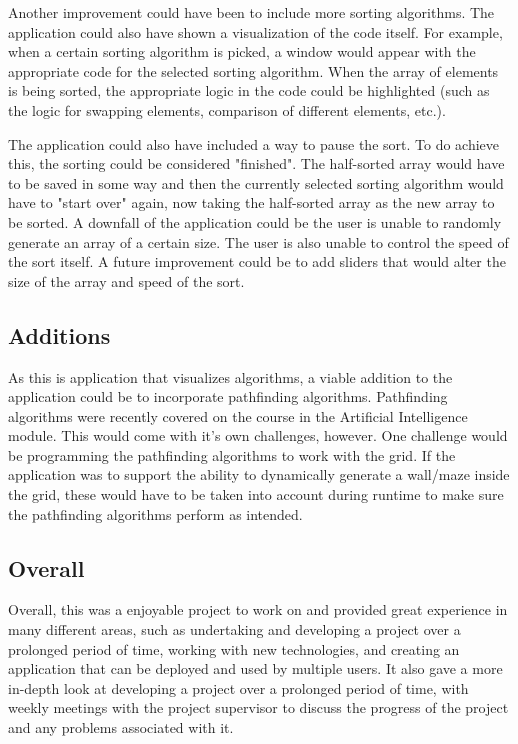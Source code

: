 Another improvement could have been to include more sorting algorithms. The application could also have shown a visualization of the code itself. For example, when a certain sorting algorithm is picked, a window would appear with the appropriate code for the selected sorting algorithm. When the array of elements is being sorted, the appropriate logic in the code could be highlighted (such as the logic for swapping elements, comparison of different elements, etc.).
\bigskip

The application could also have included a way to pause the sort. To do achieve this, the sorting could be considered "finished". The half-sorted array would have to be saved in some way and then the currently selected sorting algorithm would have to "start over" again, now taking the half-sorted array as the new array to be sorted. 
\bigskip
A downfall of the application could be the user is unable to randomly generate an array of a certain size. The user is also unable to control the speed of the sort itself. A future improvement could be to add sliders that would alter the size of the array and speed of the sort.

\subsection{Additions}
As this is application that visualizes algorithms, a viable addition to the application could be to incorporate pathfinding algorithms. Pathfinding algorithms were recently covered on the course in the Artificial Intelligence module. This would come with it's own challenges, however. One challenge would be programming the pathfinding algorithms to work with the grid. If the application was to support the ability to dynamically generate a wall/maze inside the grid, these would have to be taken into account during runtime to make sure the pathfinding algorithms perform as intended. 

\subsection{Overall}
Overall, this was a enjoyable project to work on and provided great experience in many different areas, such as undertaking and developing a project over a prolonged period of time, working with new technologies, and creating an application that can be deployed and used by multiple users. It also gave a more in-depth look at developing a project over a prolonged period of time, with weekly meetings with the project supervisor to discuss the progress of the project and any problems associated with it.